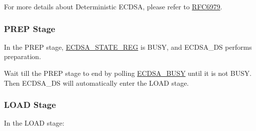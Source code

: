 \documentclass[main\_\_EN.tex]{subfiles}
\begin{document}
\begin{tiplisting}
For more details about Deterministic ECDSA, please refer to \href{https://www.rfc-editor.org/rfc/rfc6979}{RFC6979}.
\end{tiplisting}

\subsubsection{PREP Stage}

In the PREP stage, \hyperref[regdesc:ECDSASTATEREG]{ECDSA\_STATE\_REG} is BUSY, and ECDSA\_DS performs preparation.

Wait till the PREP stage to end by polling \hyperref[fielddesc:ECDSABUSY]{ECDSA\_BUSY} until it is not BUSY. Then ECDSA\_DS will automatically enter the LOAD stage.

\subsubsection{LOAD Stage}
In the LOAD stage:
\end{document}
